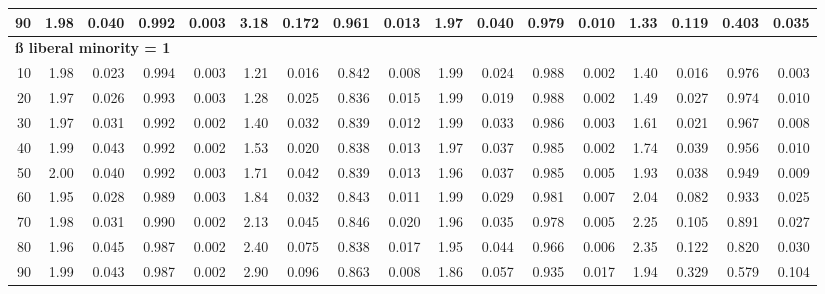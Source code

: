 \documentclass[
]{article}
\begin{document}
\begin{table}[H]
{\begin{tabular}{r|r|r|r|r|r|r|r|r|r|r|r|r|r|r|r|r}
\hline
\hspace{1em}90 & 1.98 & 0.040 & 0.992 & 0.003 & 3.18 & 0.172 & 0.961 & 0.013 & 1.97 & 0.040 & 0.979 & 0.010 & 1.33 & 0.119 & 0.403 & 0.035\\
\hline
\multicolumn{17}{l}{\textbf{ß liberal minority = 1}}\\
\hline
\hspace{1em}10 & 1.98 & 0.023 & 0.994 & 0.003 & 1.21 & 0.016 & 0.842 & 0.008 & 1.99 & 0.024 & 0.988 & 0.002 & 1.40 & 0.016 & 0.976 & 0.003\\
\hline
\hspace{1em}20 & 1.97 & 0.026 & 0.993 & 0.003 & 1.28 & 0.025 & 0.836 & 0.015 & 1.99 & 0.019 & 0.988 & 0.002 & 1.49 & 0.027 & 0.974 & 0.010\\
\hline
\hspace{1em}30 & 1.97 & 0.031 & 0.992 & 0.002 & 1.40 & 0.032 & 0.839 & 0.012 & 1.99 & 0.033 & 0.986 & 0.003 & 1.61 & 0.021 & 0.967 & 0.008\\
\hline
\hspace{1em}40 & 1.99 & 0.043 & 0.992 & 0.002 & 1.53 & 0.020 & 0.838 & 0.013 & 1.97 & 0.037 & 0.985 & 0.002 & 1.74 & 0.039 & 0.956 & 0.010\\
\hline
\hspace{1em}50 & 2.00 & 0.040 & 0.992 & 0.003 & 1.71 & 0.042 & 0.839 & 0.013 & 1.96 & 0.037 & 0.985 & 0.005 & 1.93 & 0.038 & 0.949 & 0.009\\
\hline
\hspace{1em}60 & 1.95 & 0.028 & 0.989 & 0.003 & 1.84 & 0.032 & 0.843 & 0.011 & 1.99 & 0.029 & 0.981 & 0.007 & 2.04 & 0.082 & 0.933 & 0.025\\
\hline
\hspace{1em}70 & 1.98 & 0.031 & 0.990 & 0.002 & 2.13 & 0.045 & 0.846 & 0.020 & 1.96 & 0.035 & 0.978 & 0.005 & 2.25 & 0.105 & 0.891 & 0.027\\
\hline
\hspace{1em}80 & 1.96 & 0.045 & 0.987 & 0.002 & 2.40 & 0.075 & 0.838 & 0.017 & 1.95 & 0.044 & 0.966 & 0.006 & 2.35 & 0.122 & 0.820 & 0.030\\
\hline
\hspace{1em}90 & 1.99 & 0.043 & 0.987 & 0.002 & 2.90 & 0.096 & 0.863 & 0.008 & 1.86 & 0.057 & 0.935 & 0.017 & 1.94 & 0.329 & 0.579 & 0.104\\
\hline
\end{tabular}}\begin{table}
\centering
{}
\end{table}
\end{table}
\end{document}
